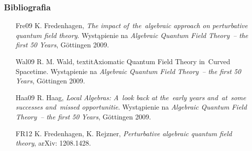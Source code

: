 \documentclass[10pt,t]{beamer}
\begin{document}
\begin{frame}
  \frametitle{Bibliografia}


  \begin{itemize}
    \RaggedRight

  \item [Fre09] K. Fredenhagen, \textit{The impact of~the~algebraic
      approach on perturbative quantum field theory}.
    Wystąpienie na \textit{Algebraic Quantum Field Theory~– the first 50
      Years}, G\"{o}ttingen 2009.

  \item [Wal09] R. M. Wald, textit{Axiomatic Quantum Field Theory
      in~Curved Spacetime}. Wystąpienie na \textit{Algebraic
      Quantum Field Theory~– the first 50 Years}, G\"{o}ttingen 2009.

  \item [Haa09] R. Haag, \textit{Local Algebras: A~look back at
    the~early years and~at~some successes and~missed opportunitie}.
    Wystąpienie na \textit{Algebraic Quantum Field Theory~– the first 50
    Years}, G\"{o}ttingen 2009.

  \item [FR12] K. Fredenhagen, K. Rejzner, \textit{Perturbative
    algebraic quantum field theory}, arXiv: 1208.1428.

  \end{itemize}

\end{frame}
\end{document}
